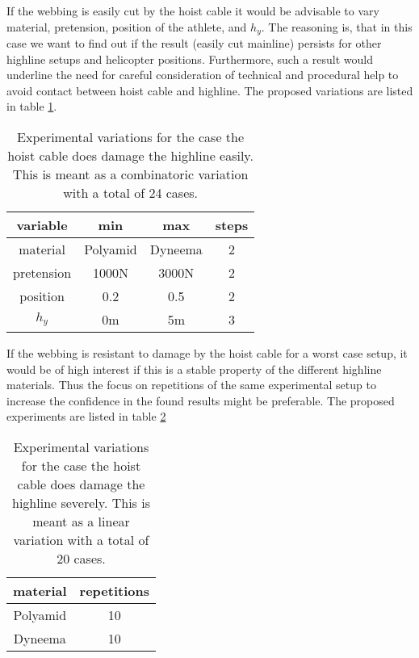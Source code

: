 \documentclass[a4paper,10pt]{scrartcl}
\begin{document}
If the webbing is easily cut by the hoist cable it would be advisable to vary material, pretension, position of the athlete, and $h_y$. The reasoning is, that in this case we want to find out if the result (easily cut mainline) persists for other highline setups and helicopter positions. Furthermore, such a result would underline the need for careful consideration of technical and procedural help to avoid contact between hoist cable and highline. The proposed variations are listed in table \ref{tbl::easycut}.

\begin{table}[ht]
\centering
\begin{tabular}{ c | c | c | c}
variable & min & max & steps \\
\hline
\hline
 material & Polyamid & Dyneema & 2 \\
 pretension & 1000N & 3000N & 2 \\
 position & 0.2 & 0.5 & 2 \\
 $h_y$ & 0m & 5m & 3
\end{tabular}
\caption{Experimental variations for the case the hoist cable does damage the highline easily. This is meant as a combinatoric variation with a total of 24 cases.}
\label{tbl::easycut}
\end{table}


If the webbing is resistant to damage by the hoist cable for a worst case setup, it would be of high interest if this is a stable property of the different highline materials. Thus the focus on repetitions of the same experimental setup to increase the confidence in the found results might be preferable. The proposed experiments are listed in table \ref{tbl::hardcut}

\begin{table}[ht]
\centering
\begin{tabular}{ c | c }
material  & repetitions  \\
\hline
\hline
 Polyamid & 10 \\
 Dyneema & 10 

\end{tabular}
\caption{Experimental variations for the case the hoist cable does damage the highline severely. This is meant as a linear variation with a total of 20 cases.}
\label{tbl::hardcut}
\end{table}
\end{document}
